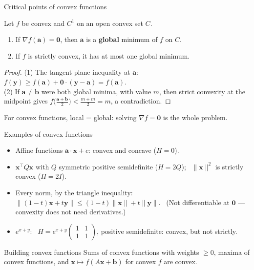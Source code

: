 \documentclass[10pt]{wosm-slides}
\newcommand{\norm}[1]{\lVert #1 \rVert}
\newcommand{\vx}{\mathbf{x}}
\newcommand{\vy}{\mathbf{y}}
\newcommand{\va}{\mathbf{a}}
\newcommand{\vb}{\mathbf{b}}
\begin{document}
\begin{frame}{Critical points of convex functions}
  \begin{theorem}
    Let $f$ be convex and $C^1$ on an open convex set $C$.
    \begin{enumerate}
      \item If $\nabla f(\va) = \mathbf 0$, then $\va$ is a \textbf{global} minimum of $f$ on $C$.
      \item If $f$ is strictly convex, it has at most one global minimum.
    \end{enumerate}
  \end{theorem}
  \pause
  \begin{proof}
    (1) The tangent-plane inequality at $\va$: \ $f(\vy) \ge f(\va) + \mathbf 0 \cdot (\vy - \va) = f(\va)$.
    \pause\\
    (2) If $\va \ne \vb$ were both global minima, with value $m$, then strict convexity at the
    midpoint gives $f\bigl(\frac{\va + \vb}{2}\bigr) < \frac{m + m}{2} = m$, a contradiction.
  \end{proof}
  \pause
  {\small For convex functions, local = global: solving $\nabla f = \mathbf 0$ is the whole problem.\par}
\end{frame}

\begin{frame}{Examples of convex functions}
  \begin{itemize}
    \item Affine functions $\va \cdot \vx + c$: convex and concave ($H = 0$).
    \item $\vx^\top Q \vx$ with $Q$ symmetric positive semidefinite ($H = 2Q$); \ $\norm{\vx}^2$ is
      strictly convex ($H = 2I$).
    \item Every norm, by the triangle inequality:
      $\norm{(1 - t)\vx + t\vy} \le (1 - t)\norm{\vx} + t\norm{\vy}$. \ (Not differentiable at
      $\mathbf 0$ --- convexity does not need derivatives.)
    \item $e^{x + y}$: \ $H = e^{x + y}\begin{pmatrix} 1 & 1 \\ 1 & 1 \end{pmatrix}$, positive
      semidefinite: convex, but not strictly.
  \end{itemize}
  \pause
  \begin{block}{Building convex functions}
    Sums of convex functions with weights $\ge 0$, maxima of convex functions, and
    $\vx \mapsto f(A\vx + \vb)$ for convex $f$ are convex.
  \end{block}
\end{frame}
\end{document}
